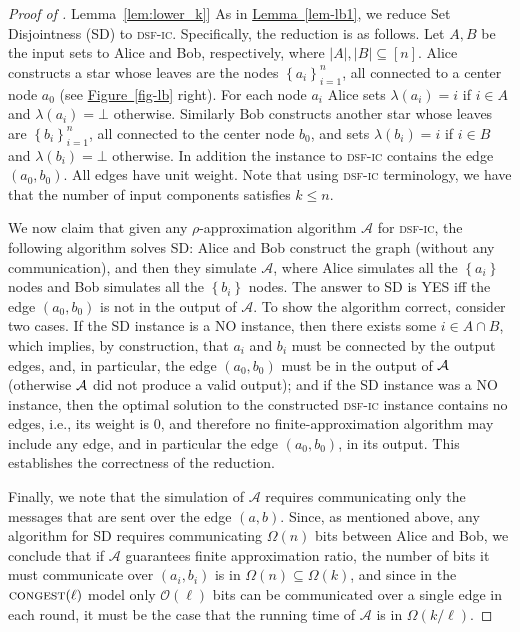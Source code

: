 \documentclass[letterpaper,11pt]{article}
\newcommand{\namedref}[2]{\hyperref[#2]{#1~\ref*{#2}}}
\newcommand{\figureref}[1]{\namedref{Figure}{#1}}
\newcommand{\lemmaref}[1]{\namedref{Lemma}{#1}}
\newcommand{\BO}{\mathcal{O}}
\newcommand{\Set}[1]{\left\{#1\right\}}
\newcommand{\Congest}{\textsc{congest}\xspace}
\def\cA{\mathcal{A}}
\newcommand{\sfic}{\textsc{dsf-ic}\xspace}
\begin{document}
\begin{proof}[Proof of \lemmaref{lem:lower_k}]
As in \lemmaref{lem-lb1}, we reduce Set Disjointness (SD) to \sfic.
Specifically, 
the reduction is as follows.
Let $A,B$ be the input sets
to Alice and Bob, respectively, where $|A|,|B|\subseteq[n]$.
Alice constructs a star whose leaves are the nodes
$\Set{a_i}_{i=1}^n$, all connected to a center node $a_0$ (see
\figureref{fig-lb} right).  
 For each node $a_i$ Alice sets $\lambda(a_i)=i$ if $i\in A$ and
$\lambda(a_i)=\bot$ otherwise. Similarly Bob
constructs another star whose leaves are $\Set{b_i}_{i=1}^n$, all
connected to the center node $b_0$, 
and sets $\lambda(b_i)=i$ if $i\in B$ and $\lambda(b_i)=\bot$
otherwise. In addition the instance to \sfic contains the edge
$(a_0,b_0)$. All edges have unit weight.
Note that using \sfic terminology, we have that the number of input
components satisfies $k\le n$.


We now claim that given any $\rho$-approximation algorithm $\cA$ for \sfic,
the following algorithm solves SD: Alice and Bob construct the graph
(without any communication), and then they simulate 
$\cA$, where Alice simulates all the $\Set{a_i}$ nodes and Bob simulates
all the $\Set{b_i}$ nodes. The answer to SD is YES iff the
edge $(a_0,b_0)$ is not in the output of $\cA$.
To show the algorithm correct, consider two cases.
If the SD instance is  a NO instance, then there exists some $i\in
A\cap B$, which implies, by construction, that $a_i$ and $b_i$ must be
connected by the output edges, and, in particular, the edge  $(a_0,b_0)$ must 
be in the output of $\cal A$ (otherwise $\cal A$ did not produce a
valid output); and if the SD
instance was   a 
NO instance, then the optimal solution to the constructed \sfic instance
contains no edges, i.e., its weight is $0$, and therefore no
finite-approximation 
algorithm may include any edge, and in particular the edge $(a_0,b_0)$, in its output. This
establishes the correctness of the reduction. 

Finally, we note that 
the simulation of $\cA$ requires communicating only the messages
that are sent over the edge $(a,b)$. Since, as mentioned above, any
algorithm for SD 
requires communicating $\Omega(n)$ bits between Alice and Bob, we conclude that if $\cA$
guarantees finite approximation ratio, the number of bits  it must
communicate over $(a_i,b_i)$ is in $\Omega(n)\subseteq\Omega(k)$, and
since in the 
$\Congest(\ell)$ model only $\BO(\ell)$ bits can be communicated over
a single edge in each round,
it must be the case that the running time of $\cA$ is in
$\Omega(k/\ell)$.
\end{proof}
\end{document}
